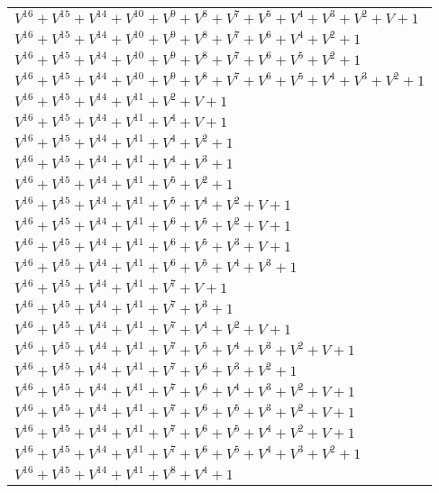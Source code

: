 \documentclass[12pt]{article}
\begin{document}
\begin{adjustwidth}{-4cm}{}
\begin{center}
\begin{longtable}{|l|}
$V^{16}  +V^{15}  +V^{14}  +V^{10}  +V^{9}  +V^{8}  +V^{7}  +V^{5}  +V^{4}  +V^{3}  +V^{2}  + V + 1$ \\
$V^{16}  +V^{15}  +V^{14}  +V^{10}  +V^{9}  +V^{8}  +V^{7}  +V^{6}  +V^{4}  +V^{2}  + 1$ \\
$V^{16}  +V^{15}  +V^{14}  +V^{10}  +V^{9}  +V^{8}  +V^{7}  +V^{6}  +V^{5}  +V^{2}  + 1$ \\
$V^{16}  +V^{15}  +V^{14}  +V^{10}  +V^{9}  +V^{8}  +V^{7}  +V^{6}  +V^{5}  +V^{4}  +V^{3}  +V^{2}  + 1$ \\
$V^{16}  +V^{15}  +V^{14}  +V^{11}  +V^{2}  + V + 1$ \\
$V^{16}  +V^{15}  +V^{14}  +V^{11}  +V^{4}  + V + 1$ \\
$V^{16}  +V^{15}  +V^{14}  +V^{11}  +V^{4}  +V^{2}  + 1$ \\
$V^{16}  +V^{15}  +V^{14}  +V^{11}  +V^{4}  +V^{3}  + 1$ \\
$V^{16}  +V^{15}  +V^{14}  +V^{11}  +V^{5}  +V^{2}  + 1$ \\
$V^{16}  +V^{15}  +V^{14}  +V^{11}  +V^{5}  +V^{4}  +V^{2}  + V + 1$ \\
$V^{16}  +V^{15}  +V^{14}  +V^{11}  +V^{6}  +V^{5}  +V^{2}  + V + 1$ \\
$V^{16}  +V^{15}  +V^{14}  +V^{11}  +V^{6}  +V^{5}  +V^{3}  + V + 1$ \\
$V^{16}  +V^{15}  +V^{14}  +V^{11}  +V^{6}  +V^{5}  +V^{4}  +V^{3}  + 1$ \\
$V^{16}  +V^{15}  +V^{14}  +V^{11}  +V^{7}  + V + 1$ \\
$V^{16}  +V^{15}  +V^{14}  +V^{11}  +V^{7}  +V^{3}  + 1$ \\
$V^{16}  +V^{15}  +V^{14}  +V^{11}  +V^{7}  +V^{4}  +V^{2}  + V + 1$ \\
$V^{16}  +V^{15}  +V^{14}  +V^{11}  +V^{7}  +V^{5}  +V^{4}  +V^{3}  +V^{2}  + V + 1$ \\
$V^{16}  +V^{15}  +V^{14}  +V^{11}  +V^{7}  +V^{6}  +V^{3}  +V^{2}  + 1$ \\
$V^{16}  +V^{15}  +V^{14}  +V^{11}  +V^{7}  +V^{6}  +V^{4}  +V^{3}  +V^{2}  + V + 1$ \\
$V^{16}  +V^{15}  +V^{14}  +V^{11}  +V^{7}  +V^{6}  +V^{5}  +V^{3}  +V^{2}  + V + 1$ \\
$V^{16}  +V^{15}  +V^{14}  +V^{11}  +V^{7}  +V^{6}  +V^{5}  +V^{4}  +V^{2}  + V + 1$ \\
$V^{16}  +V^{15}  +V^{14}  +V^{11}  +V^{7}  +V^{6}  +V^{5}  +V^{4}  +V^{3}  +V^{2}  + 1$ \\
$V^{16}  +V^{15}  +V^{14}  +V^{11}  +V^{8}  +V^{4}  + 1$ \\

\end{longtable}
\end{center}
\end{adjustwidth}
\end{document}
